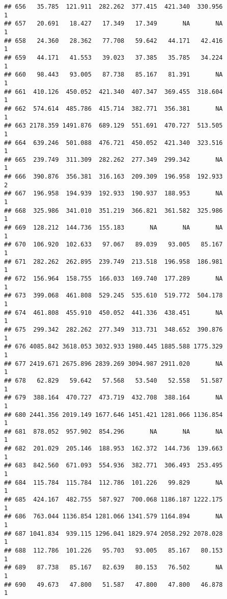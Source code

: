 \documentclass[
]{article}
\begin{document}
\begin{verbatim}
## 656   35.785  121.911  282.262  377.415  421.340  330.956             1
## 657   20.691   18.427   17.349   17.349       NA       NA             1
## 658   24.360   28.362   77.708   59.642   44.171   42.416             1
## 659   44.171   41.553   39.023   37.385   35.785   34.224             1
## 660   98.443   93.005   87.738   85.167   81.391       NA             1
## 661  410.126  450.052  421.340  407.347  369.455  318.604             1
## 662  574.614  485.786  415.714  382.771  356.381       NA             1
## 663 2178.359 1491.876  689.129  551.691  470.727  513.505             1
## 664  639.246  501.088  476.721  450.052  421.340  323.516             1
## 665  239.749  311.309  282.262  277.349  299.342       NA             1
## 666  390.876  356.381  316.163  209.309  196.958  192.933             2
## 667  196.958  194.939  192.933  190.937  188.953       NA             1
## 668  325.986  341.010  351.219  366.821  361.582  325.986             1
## 669  128.212  144.736  155.183       NA       NA       NA             1
## 670  106.920  102.633   97.067   89.039   93.005   85.167             1
## 671  282.262  262.895  239.749  213.518  196.958  186.981             1
## 672  156.964  158.755  166.033  169.740  177.289       NA             1
## 673  399.068  461.808  529.245  535.610  519.772  504.178             1
## 674  461.808  455.910  450.052  441.336  438.451       NA             1
## 675  299.342  282.262  277.349  313.731  348.652  390.876             1
## 676 4085.842 3618.053 3032.933 1980.445 1885.588 1775.329             1
## 677 2419.671 2675.896 2839.269 3094.987 2911.020       NA             1
## 678   62.829   59.642   57.568   53.540   52.558   51.587             1
## 679  388.164  470.727  473.719  432.708  388.164       NA             1
## 680 2441.356 2019.149 1677.646 1451.421 1281.066 1136.854             1
## 681  878.052  957.902  854.296       NA       NA       NA             1
## 682  201.029  205.146  188.953  162.372  144.736  139.663             1
## 683  842.560  671.093  554.936  382.771  306.493  253.495             1
## 684  115.784  115.784  112.786  101.226   99.829       NA             1
## 685  424.167  482.755  587.927  700.068 1186.187 1222.175             1
## 686  763.044 1136.854 1281.066 1341.579 1164.894       NA             1
## 687 1041.834  939.115 1296.041 1829.974 2058.292 2078.028             1
## 688  112.786  101.226   95.703   93.005   85.167   80.153             1
## 689   87.738   85.167   82.639   80.153   76.502       NA             1
## 690   49.673   47.800   51.587   47.800   47.800   46.878             1

\end{verbatim}
\end{document}
